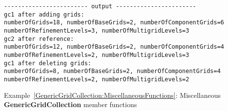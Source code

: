 \documentclass{article}
\begin{document}
{\small
{}
\begin{verbatim}
------------------------ output -----------------------
gc1 after adding grids:
numberOfGrids=18, numberOfBaseGrids=2, numberOfComponentGrids=6
numberOfRefinementLevels=3, numberOfMultigridLevels=3
gc2 after reference:
numberOfGrids=12, numberOfBaseGrids=2, numberOfComponentGrids=4
numberOfRefinementLevels=2, numberOfMultigridLevels=3
gc1 after deleting grids:
numberOfGrids=8, numberOfBaseGrids=2, numberOfComponentGrids=4
numberOfRefinementLevels=2, numberOfMultigridLevels=2
\end{verbatim}
}
{\center Example~\ref{GenericGridCollection:MiscellaneousFunctions}: Miscellaneous \textbf{GenericGridCollection} member functions\label{GenericGridCollection:MiscellaneousFunctions}}

\end{document}
